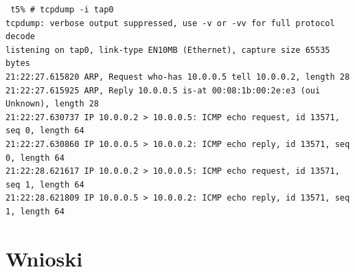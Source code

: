 \documentclass[a4paper,11pt,notitlepage]{article}
\begin{document}
\begin{verbatim}
 t5% # tcpdump -i tap0 
tcpdump: verbose output suppressed, use -v or -vv for full protocol decode
listening on tap0, link-type EN10MB (Ethernet), capture size 65535 bytes
21:22:27.615820 ARP, Request who-has 10.0.0.5 tell 10.0.0.2, length 28
21:22:27.615925 ARP, Reply 10.0.0.5 is-at 00:08:1b:00:2e:e3 (oui Unknown), length 28
21:22:27.630737 IP 10.0.0.2 > 10.0.0.5: ICMP echo request, id 13571, seq 0, length 64
21:22:27.630860 IP 10.0.0.5 > 10.0.0.2: ICMP echo reply, id 13571, seq 0, length 64
21:22:28.621617 IP 10.0.0.2 > 10.0.0.5: ICMP echo request, id 13571, seq 1, length 64
21:22:28.621809 IP 10.0.0.5 > 10.0.0.2: ICMP echo reply, id 13571, seq 1, length 64
\end{verbatim}


\section{Wnioski}
\end{document}
